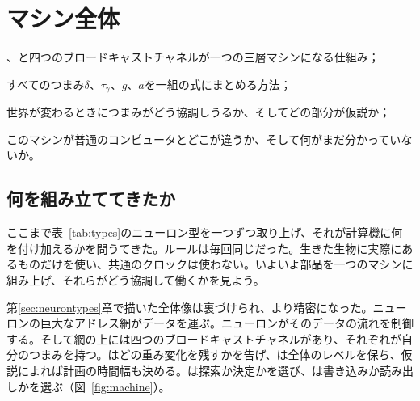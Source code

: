 \chapter{マシン全体}
\label{sec:synthesis}
\begin{chaptergoals}
\item {}、と四つのブロードキャストチャネルが一つの三層マシンになる仕組み；
\item すべてのつまみ$\delta$、$\tau_\gamma$、$g$、$a$を一組の式にまとめる方法；
\item 世界が変わるときにつまみがどう協調しうるか、そしてどの部分が仮説か；
\item このマシンが普通のコンピュータとどこが違うか、そして何がまだ分かっていないか。
\end{chaptergoals}

\section{何を組み立ててきたか}

ここまで表~\ref{tab:types}のニューロン型を一つずつ取り上げ、それが計算機に何を付け加えるかを問うてきた。ルールは毎回同じだった。生きた生物に実際にあるものだけを使い、共通のクロックは使わない。いよいよ部品を一つのマシンに組み上げ、それらがどう協調して働くかを見よう。

第\ref{sec:neurontypes}章で描いた全体像は裏づけられ、より精密になった。ニューロンの巨大なアドレス網がデータを運ぶ。ニューロンがそのデータの流れを制御する。そして網の上には四つのブロードキャストチャネルがあり、それぞれが自分のつまみを持つ。はどの重み変化を残すかを告げ、は全体のレベルを保ち、仮説によれば計画の時間幅も決める。は探索か決定かを選び、は書き込みか読み出しかを選ぶ（図~\ref{fig:machine}）。

